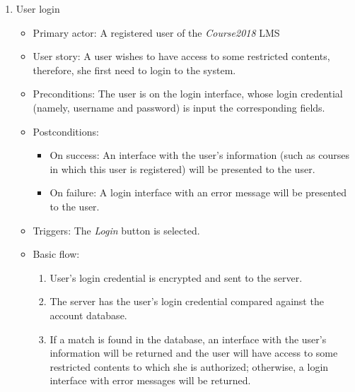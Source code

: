 \begin{enumerate}
\item User login
\begin{itemize}
\item Primary actor:
    A registered user of the \emph{Course2018} LMS
\item User story:
    A user wishes to have access to some restricted contents, therefore, she
    first need to login to the system.
\item Preconditions:
    The user is on the login interface, whose login credential
    (namely, username and password) is input the corresponding fields.
\item Postconditions:
    \begin{itemize}
        \item On success: An interface with the user's information (such as courses
            in which this user is registered) will be presented to the user.
        \item On failure: A login interface with an error message will be
            presented to the user.
    \end{itemize}
\item Triggers: The \emph{Login} button is selected.
\item Basic flow:
    \begin{enumerate}
        \item User's login credential is encrypted and sent to the server.
        \item The server has the user's login credential compared against the
            account database.
        \item If a match is found in the database, an interface with the user's
            information will be returned and the user will have access to
            some restricted contents to which she is authorized; otherwise, a
            login interface with error messages will be returned.
    \end{enumerate}
\end{itemize}


\end{enumerate}
